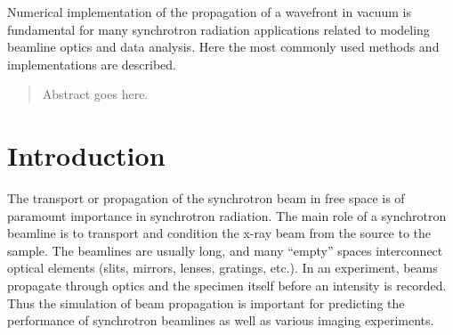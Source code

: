 \documentclass{iucr}              %
\begin{document}



\maketitle                        %

\begin{synopsis}
Numerical implementation of the propagation of a wavefront in vacuum is fundamental for many synchrotron radiation applications related to modeling beamline optics and data analysis. Here the most commonly used methods and implementations are described. 
\end{synopsis}

\begin{abstract}
Abstract goes here.
\end{abstract}



\section{Introduction}
\label{ch:intro}

The transport or propagation of the synchrotron beam in free space is of paramount importance in synchrotron radiation. 
The main role of a synchrotron beamline is to transport and condition the x-ray beam from the source to the sample. The beamlines are usually long, and many ``empty'' spaces interconnect optical elements (slits, mirrors, lenses, gratings, etc.). In an experiment, beams propagate through optics and the specimen itself before an intensity is recorded.  Thus the simulation of beam propagation is important for predicting the performance of synchrotron beamlines as well as various imaging experiments.
\end{document}
